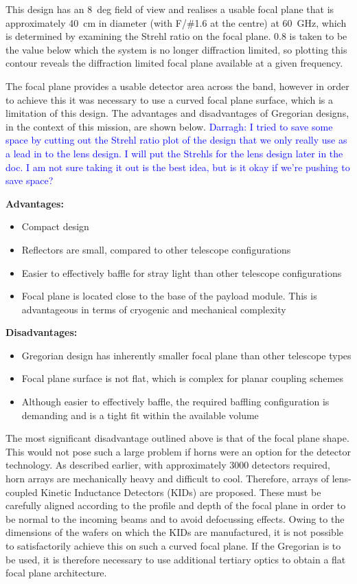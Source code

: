 \documentclass[11pt,a4paper]{article}
\newcommand{\comblue}[1]{\textcolor{blue}{#1}}
\begin{document}
This design has an 8~deg field of view and realises a usable focal plane that is approximately 40~cm in diameter (with F/\#1.6 at the centre) at 60~GHz, which is determined by examining the Strehl ratio on the focal plane. 0.8 is taken to be the value below which the system is no longer diffraction limited, so plotting this contour reveals the diffraction limited focal plane available at a given frequency. 

The focal plane provides a usable detector area across the band, however in order to achieve this it was necessary to use a curved focal plane surface, which is a limitation of this design. The advantages and disadvantages of Gregorian designs, in the context of this mission, are shown below. \comblue{Darragh: I tried to save some space by cutting out the Strehl ratio plot of the design that we only really use as a lead in to the lens design. I will put the Strehls for the lens design later in the doc. I am not sure taking it out is the best idea, but is it okay if we're pushing to save space?}


\textbf{Advantages:}
\begin{itemize}
	\item Compact design
	\item Reflectors are small, compared to other telescope configurations
	\item Easier to effectively baffle for stray light than other telescope configurations
	\item Focal plane is located close to the base of the payload module. This is advantageous in terms of cryogenic and mechanical complexity
\end{itemize}

\textbf{Disadvantages:}
\begin{itemize}
	\item Gregorian design has inherently smaller focal plane than other telescope types
	\item Focal plane surface is not flat, which is complex for planar coupling schemes
	\item Although easier to effectively baffle, the required baffling configuration is demanding and is a tight fit within the available volume
\end{itemize}
The most significant disadvantage outlined above is that of the focal plane shape. This would not pose such a large problem if horns were an option for the detector technology. As described earlier, with approximately 3000 detectors required, horn arrays are mechanically heavy and difficult to cool. Therefore, arrays of lens-coupled  Kinetic Inductance Detectors (KIDs) are proposed. These must be carefully aligned according to the profile and depth of the focal plane in order to be normal to the incoming beams and to avoid defocussing effects. Owing to the dimensions of the wafers on which the KIDs are manufactured, it is not possible to satisfactorily achieve this on such a curved focal plane. If the Gregorian is to be used, it is therefore necessary to use additional tertiary optics to obtain a flat focal plane architecture.
\end{document}
